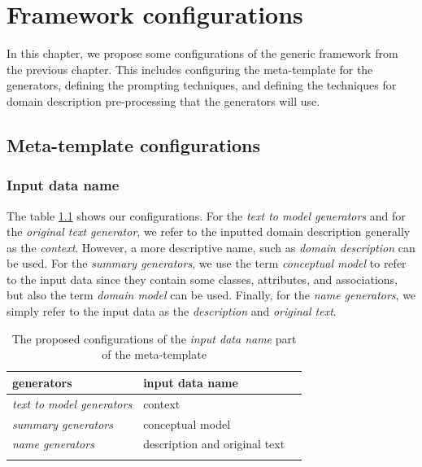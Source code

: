 \chapter{Framework configurations}
\label{chap:framework_configuration}

In this chapter, we propose some configurations of the generic framework from the previous chapter. This includes configuring the meta-template for the generators, defining the prompting techniques, and defining the techniques for domain description pre-processing that the generators will use.


\section{Meta-template configurations}

\subsection{Input data name}

The table \ref{tab:input_data_name} shows our configurations. For the \emph{text to model generators} and for the \emph{original text generator}, we refer to the inputted domain description generally as the \textit{context}. However, a more descriptive name, such as \textit{domain description} can be used. For the \emph{summary generators}, we use the term \textit{conceptual model} to refer to the input data since they contain some classes, attributes, and associations, but also the term \emph{domain model} can be used.
Finally, for the \emph{name generators}, we simply refer to the input data as the \textit{description} and \textit{original text}.

\begin{table}[!h]
    \scriptsize
    \centering
    \setlength{\tabcolsep}{0.5em}
\begin{tabular}{@{}l>{\raggedright\arraybackslash}p{}>{\raggedright\arraybackslash}p{}@{}}
   generators & input data name \\
    \toprule
    \addlinespace
    
\emph{text to model generators} & context \\
\addlinespace

\emph{summary generators} & conceptual model \\
\addlinespace

\emph{name generators} & description and original text \\
\addlinespace

	\bottomrule
	\addlinespace
	\end{tabular}
	\caption{The proposed configurations of the \emph{input data name} part of the meta-template}
	\label{tab:input_data_name}
\end{table}


